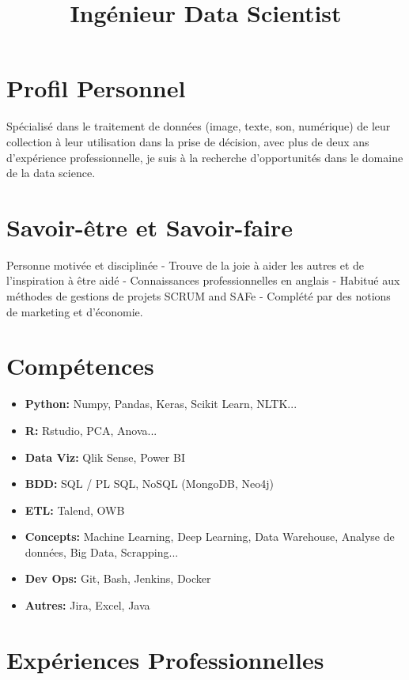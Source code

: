 \documentclass[11pt,a4paper,sans]{moderncv}
\title{Ingénieur Data Scientist}
\begin{document}
\makecvtitle

\section{Profil Personnel}
Spécialisé dans le traitement de données (image, texte, son, numérique) de leur collection à leur utilisation dans la prise de décision, avec plus de deux ans d'expérience professionnelle, je suis à la recherche d'opportunités dans le domaine de la data science.

\section{Savoir-être et Savoir-faire}
Personne motivée et disciplinée - Trouve de la joie à aider les autres et de l'inspiration à être aidé - Connaissances professionnelles en anglais - Habitué aux méthodes de gestions de projets SCRUM and SAFe - Complété par des notions de marketing et d'économie.

\section{Compétences}
\begin{itemize}
\item \textbf{Python:} Numpy, Pandas, Keras, Scikit Learn, NLTK...
\item \textbf{R:} Rstudio, PCA, Anova...
\item \textbf{Data Viz:} Qlik Sense, Power BI
\item \textbf{BDD:} SQL / PL SQL, NoSQL (MongoDB, Neo4j)
\item \textbf{ETL:} Talend, OWB
\item \textbf{Concepts:} Machine Learning, Deep Learning, Data Warehouse, Analyse de données, Big Data, Scrapping...
\item \textbf{Dev Ops:} Git, Bash, Jenkins, Docker
\item \textbf{Autres:} Jira, Excel, Java
\end{itemize}

\section{Expériences Professionnelles}

\end{document}
